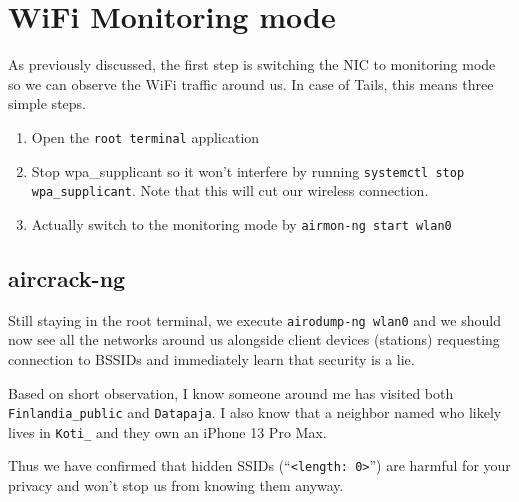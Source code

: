 \documentclass[../wifi-security.tex]{subfiles}
\begin{document}
\chapter{WiFi Monitoring mode}


As previously discussed, %
the first step is switching the NIC to monitoring mode so we can observe the WiFi traffic around us.
In case of Tails, this means three simple steps.

\begin{enumerate}
	\item Open the \texttt{root terminal} application
	\item Stop wpa\_supplicant so it won't interfere by running \texttt{systemctl stop wpa\_supplicant}. Note that this will cut our wireless connection.
	\item Actually switch to the monitoring mode by \texttt{airmon-ng start wlan0}
\end{enumerate}


\section{aircrack-ng}

Still staying in the root terminal, we execute \texttt{airodump-ng wlan0} and we should now see all the networks around us alongside client devices (stations) requesting connection to BSSIDs and immediately learn that security is a lie.

Based on short observation, I know someone around me has visited both \texttt{Finlandia\_public} and \texttt{Datapaja}. I also know that a neighbor named \Name who likely lives in \texttt{Koti\_\Name} and they own an iPhone 13 Pro Max.

Thus we have confirmed that hidden SSIDs (``\texttt{<length: 0>}'') are harmful for your privacy and won't stop us from knowing them anyway.

%
%
\end{document}
